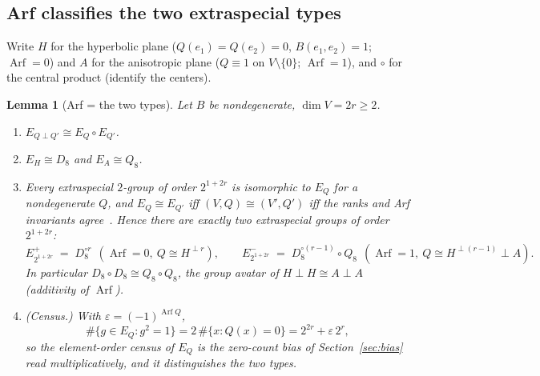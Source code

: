 \documentclass[11pt]{article}
\theoremstyle{plain}
\newtheorem{lemma}{Lemma}
\theoremstyle{definition}
\newcommand{\Arf}{\operatorname{Arf}}
\begin{document}
\subsection{Arf classifies the two extraspecial types}

Write $H$ for the hyperbolic plane ($Q(e_1)=Q(e_2)=0$, $B(e_1,e_2)=1$;
$\Arf=0$) and $A$ for the anisotropic plane ($Q\equiv1$ on $V\setminus\{0\}$;
$\Arf=1$), and $\circ$ for the central product (identify the centers).

\begin{lemma}[Arf = the two types]\label{lem:arftypes}
Let $B$ be nondegenerate, $\dim V=2r\geq2$.
\begin{enumerate}[label=(\roman*),leftmargin=*]
\item $E_{Q\perp Q'}\cong E_Q\circ E_{Q'}$.
\item $E_H\cong D_8$ and $E_A\cong Q_8$.
\item Every extraspecial $2$-group of order $2^{1+2r}$ is isomorphic to
$E_Q$ for a nondegenerate $Q$, and
$E_Q\cong E_{Q'}$ iff $(V,Q)\cong(V',Q')$ iff the ranks and Arf invariants
agree~\cite{Dickson01,Arf41}. Hence there are exactly two extraspecial
groups of order $2^{1+2r}$:
\[
E^+_{2^{1+2r}}\;=\;D_8^{\circ r}\ \ (\Arf=0,\ Q\cong H^{\perp r}),
\qquad
E^-_{2^{1+2r}}\;=\;D_8^{\circ(r-1)}\circ Q_8\ \ (\Arf=1,\ Q\cong
H^{\perp(r-1)}\perp A).
\]
In particular $D_8\circ D_8\cong Q_8\circ Q_8$, the group avatar of
$H\perp H\cong A\perp A$ (additivity of $\Arf$).
\item (Census.) With $\varepsilon=(-1)^{\Arf Q}$,
\[
\#\{g\in E_Q: g^2=1\}=2\,\#\{x:Q(x)=0\}=2^{2r}+\varepsilon\,2^{r},
\]
so the element-order census of $E_Q$ is the zero-count bias of
Section~\ref{sec:bias} read multiplicatively, and it distinguishes the two
types.
\end{enumerate}
\end{lemma}
\end{document}
